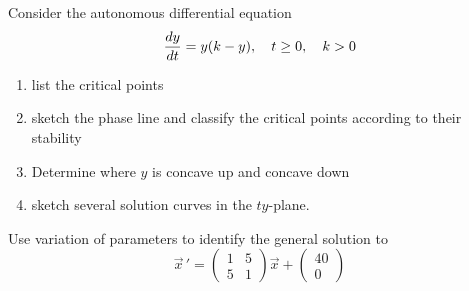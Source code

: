 \documentclass[12pt]{exam}
\begin{document}
\begin{questions}
    

    

    
\newpage \InitialsRight

    \question[10] Consider the autonomous differential equation 
    $${\frac{dy}{dt}} = y(k - y), \quad t \ge 0, \quad k  > 0$$  %
    \begin{enumerate}[label=(\roman*)]
        \item list the critical points \vspace{1cm}
        \item sketch the phase line and classify the critical points according to their stability \vspace{4cm}
        \item Determine where $y$ is concave up and concave down \vspace{6cm}
        \item sketch several solution curves in the $ty$-plane. 
    \end{enumerate}

\newpage \InitialsLeft

    \question[10] 
    
    Use variation of parameters to identify the general solution to \[\vec{x} \, ' = \left( \begin{array}{rr} 1 & 5 \\ 5 & 1 \end{array} \right) \vec{x}  + \left( \begin{array}{r}  40\\ 0\end{array} \right)  \]   %
    
    



\end{questions}
\end{document}

